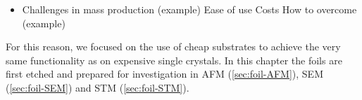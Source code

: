 

\begin{itemize}	
	\item Challenges in mass production (example)
  	  \subitem Ease of use
 	  \subitem Costs
	    \subsubitem How to overcome (example)
\end{itemize}	

For this reason, we focused on the use of cheap substrates to achieve the very same functionality as on expensive single crystals. In this chapter the foils are first etched and prepared for investigation in AFM (\ref{sec:foil-AFM}), SEM (\ref{sec:foil-SEM}) and STM (\ref{sec:foil-STM}). 
